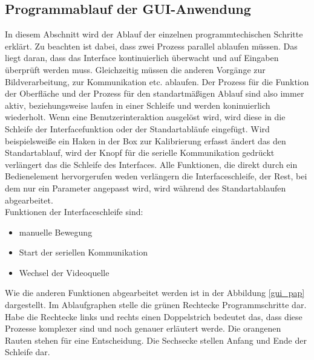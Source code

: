 \subsection{Programmablauf der GUI-Anwendung}
\label{subsect:pap}

In diesem Abschnitt wird der Ablauf der einzelnen programmtechischen Schritte erklärt. Zu beachten ist dabei, dass zwei Prozess parallel ablaufen müssen. Das liegt daran, dass das Interface kontinuierlich überwacht und auf Eingaben überprüft werden muss. Gleichzeitig müssen die anderen Vorgänge zur Bildverarbeitung, zur Kommunikation etc. ablaufen. 
Der Prozess für die Funktion der Oberfläche und der Prozess für den standartmäßigen Ablauf sind also immer aktiv, beziehungsweise laufen in einer Schleife und werden koninuierlich wiederholt. Wenn eine Benutzerinteraktion ausgelöst wird, wird diese in die Schleife der  Interfacefunktion oder der Standartabläufe eingefügt. Wird beispielsweiße ein Haken in der Box zur Kalibrierung erfasst ändert das den Standartablauf, wird der Knopf für die serielle Kommunikation gedrückt verlängert das die Schleife des Interfaces. Alle Funktionen, die direkt durch ein Bedienelement hervorgerufen weden verlängern die Interfaceschleife, der Rest, bei dem nur ein Parameter angepasst wird, wird während des Standartablaufen abgearbeitet.\\
 Funktionen der Interfaceschleife sind:\\
\begin{itemize}
\item manuelle Bewegung
\item Start der seriellen Kommunikation
\item Wechsel der Videoquelle
\end{itemize}

Wie die anderen Funktionen abgearbeitet werden ist in der Abbildung \ref{gui_pap} dargestellt. Im Ablaufgraphen stelle die grünen Rechtecke Programmschritte dar. Habe die Rechtecke links und rechts einen Doppelstrich bedeutet das, dass diese Prozesse komplexer sind und noch genauer erläutert werde. Die orangenen Rauten stehen für eine Entscheidung. Die Sechsecke stellen Anfang und Ende der Schleife dar.\\\\

